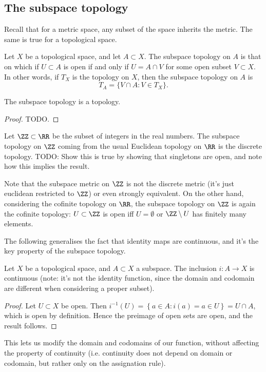 \subsection{The subspace topology}
Recall that for a metric space, any subset of the space inherits the metric. The
same is true for a topological space.
\begin{definition}
  Let $X$ be a topological space, and let $A\subset X$. The subspace topology on
  $A$ is that on which if $U\subset A$ is open if and only if $U=A\cap V$ for
  some open subset $V\subset X$. In other words, if $T_X$ is the topology on
  $X$,  then the subspace topology on $A$ is 
  \[T_A = \{V\cap A : V\in T_X\}.\]
  \label{<+label+>}
\end{definition}

\begin{proposition}
  The subspace topology is a topology.
  \label{<+label+>}
\end{proposition}
\begin{proof}
  TODO.
\end{proof}

\begin{example}
  Let $\ZZ\subset\RR$ be the subset of integers in the real numbers. The
  subspace topology on $\ZZ$ coming from the usual Euclidean topology on $\RR$
  is the discrete topology. TODO: Show this is true by showing that singletons
  are open, and note how this implies the result.
\end{example}
Note that the subspace metric on $\ZZ$ is not the discrete metric (it's just
euclidean restricted to $\ZZ$) or even strongly equivalent. On the other hand,
considering the cofinite topology on $\RR$, the subspace topology on $\ZZ$ is
again the cofinite topology: $U\subset\ZZ$ is open iff $U=\emptyset$ or
$\ZZ\setminus U$ has finitely many elements.

The following generalises the fact that identity maps are continuous, and it's
the key property of the subspace topology.
\begin{lemma}
  Let $X$ be a topological space, and $A\subset X$ a subspace. The inclusion
  $i:A\to X$ is continuous (note: it's not the identity function, since the
  domain and codomain are different when considering a proper subset).
  \label{<+label+>}
\end{lemma}
\begin{proof}
  Let $U\subset X$ be open. Then $i^{-1}(U)=\left\{ a\in A: i(a)=a\in U \right\}
  = U\cap A$, which is open by definition. Hence the preimage of open sets are
  open, and the result follows.
\end{proof}
This lets us modify the domain and codomains of our function, without affecting
the property of continuity (i.e. continuity does not depend on domain or
codomain, but rather only on the assignation rule).
